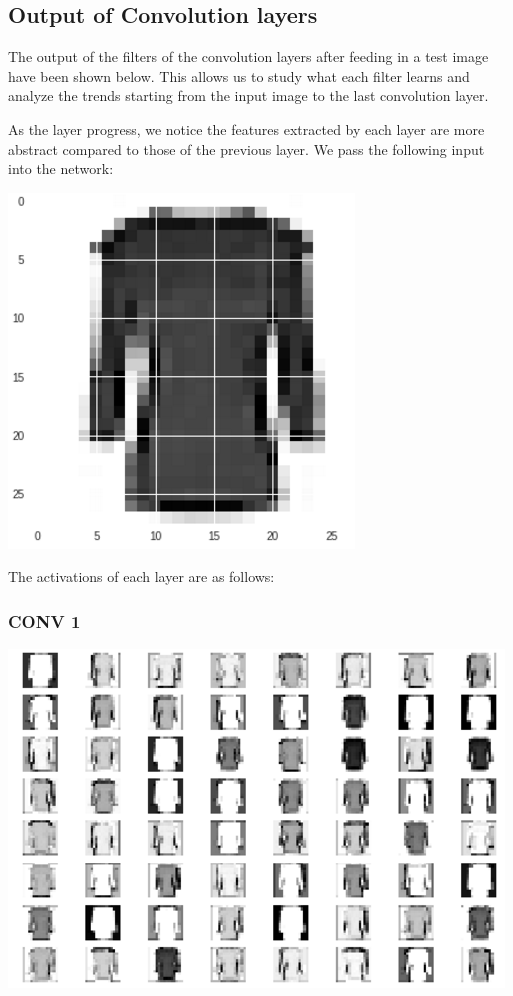 \documentclass[12pt]{report}
\begin{document}
\subsection{Output of Convolution layers}
The output of the filters of the convolution layers after feeding in a test image have been shown below. This allows us to study what each filter learns and analyze the trends starting from the input image to the last convolution layer.

As the layer progress, we notice the features extracted by each layer are more abstract compared to those of the previous layer.
We pass the following input into the network:
\begin{center}
\includegraphics[scale=0.4]{input.png}
\end{center}
The activations of each layer are as follows:
\subsubsection{CONV 1}
\begin{center}
\includegraphics[scale=0.8]{conv1.png}
\end{center}
\end{document}
